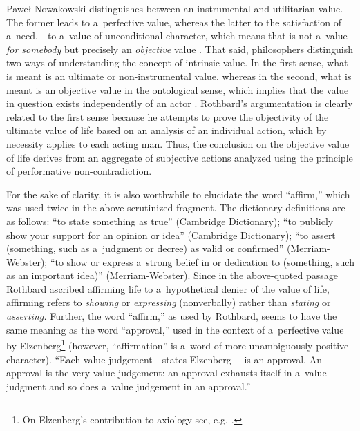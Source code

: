 \begin{artengenv}{Paweł Nowakowski}
{\parencite*[][pp.28–29]{Elzenberg1990Wartość} %
 distinguishes between an instrumental and utilitarian value. The former leads to a~perfective value, whereas the latter to the satisfaction of a~need.}---to a~value of unconditional character, which means that is not a~value \textit{for somebody} but precisely an \textit{objective} value 
\parencites[see][p.21ff]{Elzenberg1990Wartość}[][p.77]{Raz2001Value}[][]{Schroeder2021Value}[][]{Zimmerman2019Intrinsic}. %
 That said, philosophers distinguish two ways of understanding the concept of intrinsic value. In the first sense, what is meant is an ultimate or non-instrumental value, whereas in the second, what is meant is an objective value in the ontological sense, which implies that the value in question exists independently of an actor 
\parencite[see][p.8]{Frey1993Value}. %
 Rothbard's argumentation is clearly related to the first sense because he attempts to prove the objectivity of the ultimate value of life based on an analysis of an individual action, which by necessity applies to each acting man. Thus, the conclusion on the objective value of life derives from an aggregate of subjective actions analyzed using the principle of performative non-contradiction.



For the sake of clarity, it is also worthwhile to elucidate the word ``affirm,'' which was used twice in the above-scrutinized fragment. The dictionary definitions are as follows: ``to state something as true'' (Cambridge Dictionary); ``to publicly show your support for an opinion or idea'' (Cambridge Dictionary); ``to assert (something, such as a~judgment or decree) as valid or confirmed'' (Merriam-Webster); ``to show or express a~strong belief in or dedication to (something, such as an important idea)'' (Merriam-Webster). Since in the above-quoted passage Rothbard ascribed affirming life to a~hypothetical denier of the value of life, affirming refers to \textit{showing} or \textit{expressing} (nonverbally) rather than \textit{stating} or \textit{asserting.} Further, the word ``affirm,'' as used by Rothbard, seems to have the same meaning as the word ``approval,'' used in the context of a~perfective value by Elzenberg\footnote{On Elzenberg's contribution to axiology see, e.g. 
\parencite[][pp.73–86]{Porębski2019Elzenberg:}.%
} (however, ``affirmation'' is a~word of more unambiguously positive character). ``Each value judgement---states Elzenberg 
\parencite*[][p.25]{Elzenberg1990Wartość}%
---is an approval. An approval is the very value judgement: an approval exhausts itself in a~value judgment and so does a~value judgement in an approval.''




\end{artengenv}
